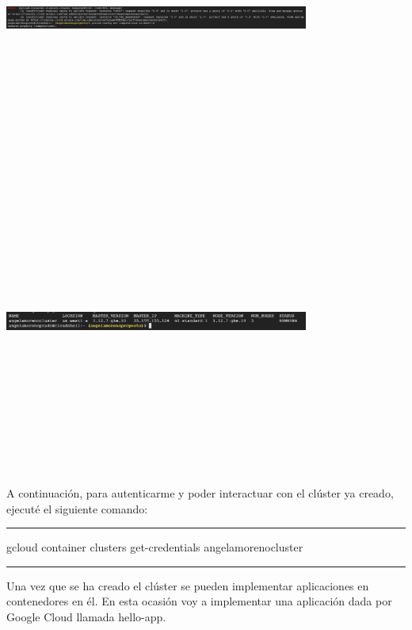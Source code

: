 \documentclass[english,runningheads,a4paper]{llncs}[2018/03/10]
\newenvironment{nscenter}
 {\parskip=0pt\par\nopagebreak\centering}
 {\par\noindent\ignorespacesafterend}
\begin{document}
\begin{nscenter}
\includegraphics[width=10cm,height=10cm,keepaspectratio]{./Contenedores/Googlecloud/45.png}
\includegraphics[width=10cm,height=10cm,keepaspectratio]{./Contenedores/Googlecloud/46.png}
\end{nscenter}
\newline
A continuación, para autenticarme y poder interactuar con el clúster ya creado, 
ejecuté el siguiente comando:
\begin{nscenter}


\noindent\rule{10cm}{0.4pt}

gcloud container clusters get-credentials angelamorenocluster

\noindent\rule{10cm}{0.4pt}
\end{nscenter}
Una vez que se ha creado el clúster se pueden implementar aplicaciones en 
contenedores en él. En esta ocasión voy a implementar una aplicación dada por 
Google Cloud llamada hello-app.
\end{document}
